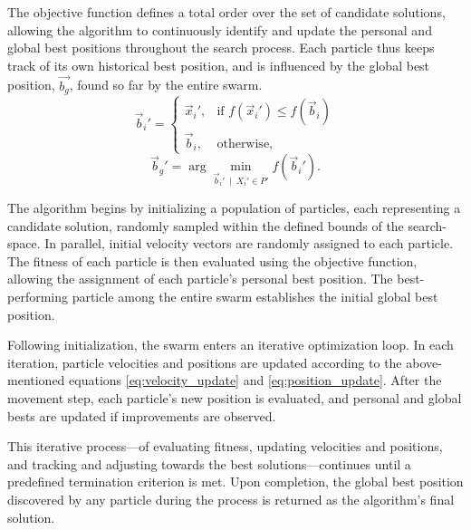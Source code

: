 {The objective function defines a total order over the set of candidate solutions, allowing the algorithm to continuously identify and update the personal and global best positions throughout the search process. Each particle thus keeps track of its own historical best position, and is influenced by the global best position, 
\(\vec{b_g}\), found so far by the entire swarm.
\begin{equation}\label{eq:pbest_update}
\vec{b}_i' =
\begin{cases}
\vec{x}_i', & \text{if } f(\vec{x}_i') \leq f(\vec{b}_i) \\
\vec{b}_i, & \text{otherwise,}
\end{cases}
\end{equation}
\begin{equation}\label{eq:gbest_update}
\vec{b}_g' = \arg\min_{{\vec{b}_i'}\ \mid\ X_i' \in P'} f(\vec{b}_i').
\end{equation}



The algorithm begins by initializing a population of particles, each representing a candidate solution, randomly sampled within the defined bounds of the \gls{search-space}. In parallel, initial velocity vectors are randomly assigned to each particle. The fitness of each particle is then evaluated using the objective function, allowing the assignment of each particle's personal best position. The best-performing particle among the entire swarm establishes the initial global best position.

Following initialization, the swarm enters an iterative optimization loop. In each iteration, particle velocities and positions are updated according to the above-mentioned equations \eqref{eq:velocity_update} and \eqref{eq:position_update}. After the movement step, each particle's new position is evaluated, and personal and global bests are updated if improvements are observed.


This iterative process---of evaluating fitness, updating velocities and positions, and tracking and adjusting towards the best solutions---continues until a predefined termination criterion is met.
Upon completion, the global best position discovered by any particle during the process is returned as the algorithm's final solution.

\vspace{.935em}

}
